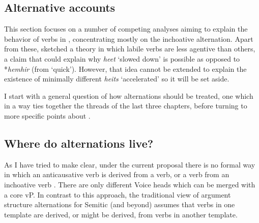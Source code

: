 \begin{exe}
\begin{xlist}
\begin{xlist}
\begin{exe}
\begin{exe}
\begin{xlist}
\begin{exe}
\begin{xlist}
\begin{exe}
\begin{xlist}
\begin{xlist}
\begin{exe}
\begin{xlist}
\begin{exe}
\begin{xlist}
\begin{exe}
\begin{xlist}
\begin{exe}
\begin{exe}
\begin{exe}
\begin{xlist}
\begin{exe}
\begin{exe}
\begin{xlist}
\begin{xlist}
\begin{exe}
\begin{xlist}
\begin{exe}
\begin{exe}
\begin{xlist}
\begin{exe}
\begin{exe}
\begin{xlist}
\begin{exe}
\begin{xlist}
\begin{exe}
\begin{xlist}
\begin{exe}
\begin{xlist}
\begin{exe}
\begin{exe}
\begin{xlist}
\begin{exe}
\begin{exe}
\begin{xlist}
\begin{xlist}
\begin{exe}
\begin{xlist}
\begin{xlist}
\begin{exe}
\begin{xlist}
\begin{exe}
\begin{xlist}
\begin{exe}
\begin{xlist}
\begin{exe}
\begin{xlist}
\begin{exe}
\begin{exe}
\begin{exe}
\begin{exe}
\begin{xlist}
\begin{exe}
\begin{exe}
\begin{xlist}
\begin{xlist}
\begin{exe}
\section{Alternative accounts} \label{vd:others}
This section focuses on a number of competing analyses aiming to explain the behavior of verbs in {\thif}, concentrating mostly on the inchoative alternation. Apart from these, \cite{lev16} sketched a theory in which labile verbs are less agentive than others, a claim that could explain why \emph{heet} `slowed down' is possible as opposed to *\emph{hemhir} (from `quick'). However, that idea cannot be extended to explain the existence of minimally different \emph{hei{ts}} `accelerated' so it will be set aside.

I start with a general question of how alternations should be treated, one which in a way ties together the threads of the last three chapters, before turning to more specific points about {\thif}.
	
	\subsection{Where do alternations live?} \label{vd:others:arad}
As I have tried to make clear, under the current proposal there is no formal way in which an anticausative verb is derived from a  verb, or a  verb from an inchoative verb \citep{schaefer08}. There are only different Voice heads which can be merged with a core vP. In contrast to this approach, the traditional view of argument structure alternations for Semitic (and beyond) assumes that verbs in one template are derived, or might be derived, from verbs in another template.


\end{exe}
\end{xlist}
\end{xlist}
\end{exe}
\end{exe}
\end{xlist}
\end{exe}
\end{exe}
\end{exe}
\end{exe}
\end{xlist}
\end{exe}
\end{xlist}
\end{exe}
\end{xlist}
\end{exe}
\end{xlist}
\end{exe}
\end{xlist}
\end{xlist}
\end{exe}
\end{xlist}
\end{xlist}
\end{exe}
\end{exe}
\end{xlist}
\end{exe}
\end{exe}
\end{xlist}
\end{exe}
\end{xlist}
\end{exe}
\end{xlist}
\end{exe}
\end{xlist}
\end{exe}
\end{exe}
\end{xlist}
\end{exe}
\end{exe}
\end{xlist}
\end{exe}
\end{xlist}
\end{xlist}
\end{exe}
\end{exe}
\end{xlist}
\end{exe}
\end{exe}
\end{exe}
\end{xlist}
\end{exe}
\end{xlist}
\end{exe}
\end{xlist}
\end{exe}
\end{xlist}
\end{xlist}
\end{exe}
\end{xlist}
\end{exe}
\end{xlist}
\end{exe}
\end{exe}
\end{xlist}
\end{xlist}
\end{exe}
